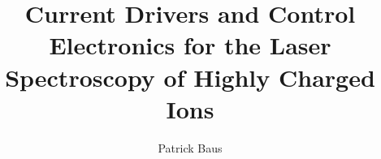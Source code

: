 \documentclass[
	ruledheaders=all,%
	class=book,%
	thesis={type=dr, dr=rernat},
	accentcolor=1b,  %
	custommargins=geometry,  %
	marginpar=false,%
	title=small,
	fontsize=11pt,%
	IMRAD=false,
	twoside,
	pdfa=true,
]{apqpub}
\begin{document}
	\title{Current Drivers and Control Electronics for the Laser Spectroscopy of Highly Charged Ions}
	\author{Patrick Baus}

	\submissiondate{\today}
	\examdate{\today}
	\maketitle

	
	\tableofcontents
	
    

    
    

\end{document}
